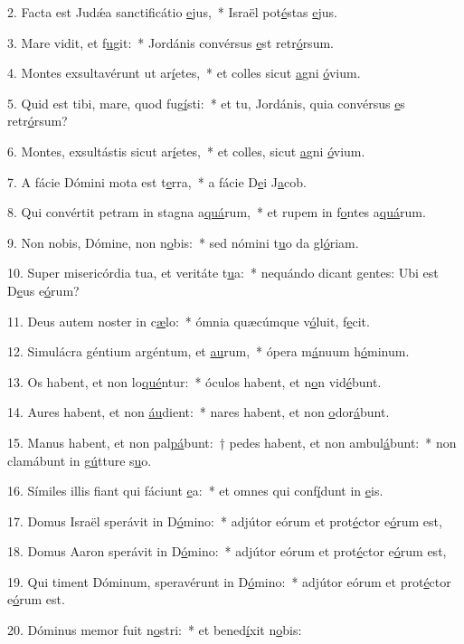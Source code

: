 2. Facta est Judǽa sanctificátio \uline{e}jus,~* Israël pot\uline{é}stas \uline{e}jus.\par 
3. Mare vidit, et f\uline{u}git:~* Jordánis convérsus \uline{e}st retr\uline{ó}rsum.\par 
4. Montes exsultavérunt ut ar\uline{í}etes,~* et colles sicut \uline{a}gni \uline{ó}vium.\par 
5. Quid est tibi, mare, quod fug\uline{í}sti:~* et tu, Jordánis, quia convérsus \uline{e}s retr\uline{ó}rsum?\par 
6. Montes, exsultástis sicut ar\uline{í}etes,~* et colles, sicut \uline{a}gni \uline{ó}vium.\par 
7. A fácie Dómini mota est t\uline{e}rra,~* a fácie D\uline{e}i J\uline{a}cob.\par 
8. Qui convértit petram in stagna a\uline{quá}rum,~* et rupem in f\uline{o}ntes a\uline{quá}rum.\par 
9. Non nobis, Dómine, non n\uline{o}bis:~* sed nómini t\uline{u}o da gl\uline{ó}riam.\par 
10. Super misericórdia tua, et veritáte t\uline{u}a:~* nequándo dicant gentes: Ubi est D\uline{e}us e\uline{ó}rum?\par 
11. Deus autem noster in c\uline{æ}lo:~* ómnia quæcúmque v\uline{ó}luit, f\uline{e}cit.\par 
12. Simulácra géntium argéntum, et \uline{au}rum,~* ópera m\uline{á}nuum h\uline{ó}minum.\par 
13. Os habent, et non lo\uline{qué}ntur:~* óculos habent, et n\uline{o}n vid\uline{é}bunt.\par 
14. Aures habent, et non \uline{áu}dient:~* nares habent, et non \uline{o}dor\uline{á}bunt.\par 
15. Manus habent, et non pal\uline{pá}bunt:~† pedes habent, et non ambul\uline{á}bunt:~* non clamábunt in g\uline{ú}tture s\uline{u}o.\par 
16. Símiles illis fiant qui fáciunt \uline{e}a:~* et omnes qui conf\uline{í}dunt in \uline{e}is.\par 
17. Domus Israël sperávit in D\uline{ó}mino:~* adjútor eórum et prot\uline{é}ctor e\uline{ó}rum est,\par 
18. Domus Aaron sperávit in D\uline{ó}mino:~* adjútor eórum et prot\uline{é}ctor e\uline{ó}rum est,\par 
19. Qui timent Dóminum, speravérunt in D\uline{ó}mino:~* adjútor eórum et prot\uline{é}ctor e\uline{ó}rum est.\par 
20. Dóminus memor fuit n\uline{o}stri:~* et bened\uline{í}xit n\uline{o}bis:\par 
